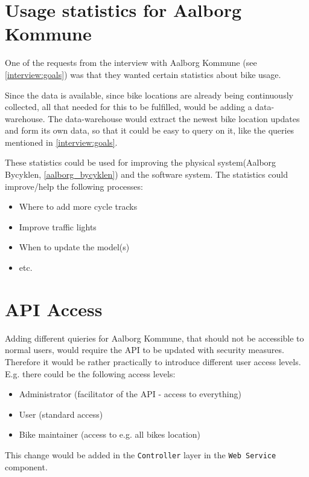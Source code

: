 \section{Usage statistics for Aalborg Kommune}
One of the requests from the interview with Aalborg Kommune (see \cref{interview:goals}) was that they wanted certain statistics about bike usage.

Since the data is available, since bike locations are already being continuously collected, all that needed for this to be fulfilled, would be adding a data-warehouse.
The data-warehouse would extract the newest bike location updates and form its own data, so that it could be easy to query on it, like the queries mentioned in \cref{interview:goals}.

These statistics could be used for improving the physical system(Aalborg Bycyklen, \cref{aalborg_bycyklen}) and the software system.
The statistics could improve/help the following processes:
\begin{itemize}
\item Where to add more cycle tracks
\item Improve traffic lights
\item When to update the model(s)
\item etc.
\end{itemize}

\section{API Access}
Adding different quieries for Aalborg Kommune, that should not be accessible to normal users, would require the API to be updated with security measures.
Therefore it would be rather practically to introduce different user access levels.
E.g. there could be the following access levels:
\begin{itemize}
\item Administrator (facilitator of the API - access to everything)
\item User (standard access)
\item Bike maintainer (access to e.g. all bikes location)
\end{itemize}
This change would be added in the \texttt{Controller} layer in the \texttt{Web Service} component.
